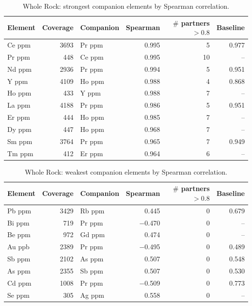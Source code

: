 \begin{table}[H]
  \centering
  \caption{Whole Rock: strongest companion elements by Spearman correlation.}
  \label{tab:wr-strongest-companions}
  \begin{tabular}{lrlrrr}
    \toprule
    Element & Coverage & Companion & Spearman & $\#$ partners $>0.8$ & Baseline \\
    \midrule
    Ce ppm & 3693 & Pr ppm & 0.995 & 5  & 0.977 \\
    Pr ppm & 448  & Ce ppm & 0.995 & 10 & --    \\
    Nd ppm & 2936 & Pr ppm & 0.994 & 5  & 0.951 \\
    Y ppm  & 4109 & Ho ppm & 0.988 & 4  & 0.868 \\
    Ho ppm & 433  & Y ppm  & 0.988 & 7  & --    \\
    La ppm & 4188 & Pr ppm & 0.986 & 5  & 0.951 \\
    Er ppm & 444  & Ho ppm & 0.985 & 7  & --    \\
    Dy ppm & 447  & Ho ppm & 0.968 & 7  & --    \\
    Sm ppm & 3764 & Pr ppm & 0.965 & 7  & 0.949 \\
    Tm ppm & 412  & Er ppm & 0.964 & 6  & --    \\
    \bottomrule
  \end{tabular}
\end{table}

\begin{table}[H]
  \centering
  \caption{Whole Rock: weakest companion elements by Spearman correlation.}
  \label{tab:wr-weakest-companions}
  \begin{tabular}{lrlrrr}
    \toprule
    Element & Coverage & Companion & Spearman & $\#$ partners $>0.8$ & Baseline \\
    \midrule
    Pb ppm & 3429 & Rb ppm & 0.445    & 0 & 0.679 \\
    Bi ppm & 719  & Pr ppm & $-$0.470 & 0 & --    \\
    Be ppm & 972  & Gd ppm & 0.474    & 0 & --    \\
    Au ppb & 2389 & Pr ppm & $-$0.495 & 0 & 0.489 \\
    Sb ppm & 2102 & As ppm & 0.507    & 0 & 0.548 \\
    As ppm & 2355 & Sb ppm & 0.507    & 0 & 0.530 \\
    Cd ppm & 1008 & Pr ppm & $-$0.509 & 0 & 0.773 \\
    Se ppm & 305  & Ag ppm & 0.558    & 0 & --    \\
    \bottomrule
  \end{tabular}
\end{table}

